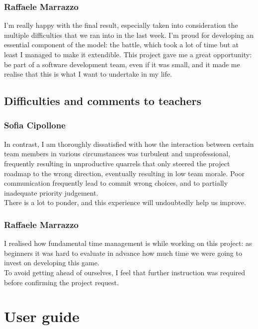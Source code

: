 \documentclass[12pt, a4paper]{report}
\theoremstyle{definition}
\begin{document}
    \subsection*{Raffaele Marrazzo}
    
    I'm really happy with the final result, especially taken into consideration the multiple difficulties that we ran into in the last week.
    I'm proud for developing an essential component of the model: the battle, which took a lot of time but at least I managed to make it extendible.
    This project gave me a great opportunity: be part of a software development team, even if it was small, and it made me realise that this is what 
    I want to undertake in my life.

\section{Difficulties and comments to teachers}

    \subsection*{Sofia Cipollone}

    In contrast, I am thoroughly dissatisfied with how the interaction between certain team members in various circumstances was turbulent and unprofessional,
    frequently resulting in unproductive quarrels that only steered the project roadmap to the wrong direction, eventually resulting in low team morale.
    Poor communication frequently lead to commit wrong choices, and to partially inadequate priority judgement.\\
    There is a lot to ponder, and this experience will undoubtedly help us improve.

    \subsection*{Raffaele Marrazzo}

    I realised how fundamental time management is while working on this project: as beginners it was hard to evaluate in advance how much time we
    were going to invest on developing this game.\\
    To avoid getting ahead of ourselves, I feel that further instruction was required before confirming the project request.

\appendix

\chapter{User guide}
\end{document}
